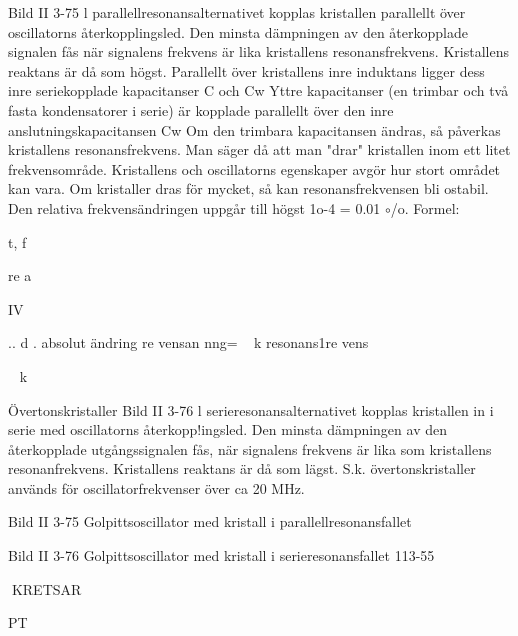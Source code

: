 {{{{Bild II 3-75
l parallellresonansalternativet kopplas
kristallen parallellt över oscillatorns återkopplingsled. Den minsta dämpningen av
den återkopplade signalen fås när signalens
frekvens är lika kristallens resonansfrekvens.
Kristallens reaktans är då som högst.
Parallellt över kristallens inre induktans
ligger dess inre seriekopplade kapacitanser
C och Cw Yttre kapacitanser (en trimbar och
två fasta kondensatorer i serie) är kopplade
parallellt över den inre anslutningskapacitansen Cw
Om den trimbara kapacitansen ändras,
så påverkas kristallens resonansfrekvens.
Man säger då att man "drar" kristallen inom
ett litet frekvensområde. Kristallens och oscillatorns egenskaper avgör hur stort området kan vara. Om kristaller dras för mycket,
så kan resonansfrekvensen bli ostabil.
Den relativa frekvensändringen uppgår
till högst 1o-4 = 0.01 \(\circ\)/o. Formel:

t, f

re a

IV

.. d .
absolut ändring
re vensan nng=
~ k
resonans1re vens

~ k

Övertonskristaller
Bild II 3-76
l serieresonansalternativet kopplas kristallen in i serie med oscillatorns återkopp!ingsled. Den minsta dämpningen av den
återkopplade utgångssignalen fås, när signalens frekvens är lika som kristallens resonanfrekvens. Kristallens reaktans är då som
lägst. S.k. övertonskristaller används för oscillatorfrekvenser över ca 20 MHz.

Bild II 3-75 Golpittsoscillator med kristall
i parallellresonansfallet

Bild II 3-76 Golpittsoscillator med kristall
i serieresonansfallet
113-55

KRETSAR

PT

}}}}
